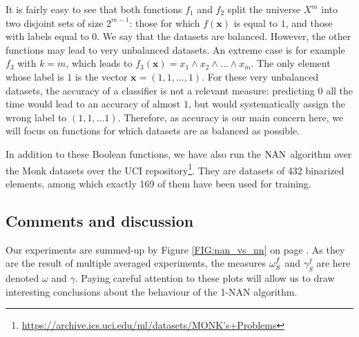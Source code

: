 It is fairly easy to see that both functions $f_1$ and $f_2$ split the universe $X^m$ into
two disjoint sets of size $2^{m - 1}$: those for which $f(\mathbf{x})$ is
equal to $1$, and those with labels equal to $0$. We say that the datasets are
balanced. However, the other functions may lead to very unbalanced datasets. An
extreme case is for example $f_3$ with $k = m$, which leads to $f_3(\mathbf{x})
= x_1 \wedge x_2 \wedge \dots \wedge x_m$. The only element whose label is $1$
is the vector $\mathbf{x} = (1, 1, \dots, 1)$. For these very unbalanced
datasets, the accuracy of a classifier is not a relevant measure: predicting
$0$ all the time would lead to an accuracy of almost $1$, but would
systematically assign the wrong label to   $(1, 1, \dots 1)$. Therefore, as
accuracy is our main concern here, we will focus on functions for which
datasets are as balanced as possible.

In addition to these Boolean functions, we have also run the $\mbox{NAN}$ algorithm
over the Monk datasets over the UCI
repository\footnote{\url{https://archive.ics.uci.edu/ml/datasets/MONK's+Problems}}.
They are datasets of 432 binarized elements, among which exactly 169 of them
have been used for training.

\subsection{Comments and discussion}

Our experiments are summed-up by Figure \ref{FIG:nan_vs_nn} on page
\pageref{FIG:nan_vs_nn}. As they are the result of multiple averaged
experiments, the measures $\omega_{S}^{f}$ and $\gamma_S^f$ are here denoted $\omega$
and $\gamma$. Paying careful attention to these plots will allow us to draw
interesting conclusions about the behaviour of the 1-NAN algorithm.

